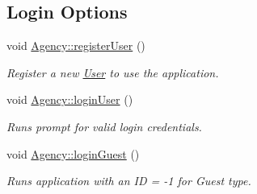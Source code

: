 \subsection*{Login Options}
\begin{DoxyCompactItemize}
\item 
void \hyperlink{group___agency_ga75a16a58bcbc705df50e89531f513c49}{Agency\+::register\+User} ()
\begin{DoxyCompactList}\small\item\em Register a new \hyperlink{class_user}{User} to use the application. \end{DoxyCompactList}\item 
\mbox{\label{group___agency_gae4523bdce3f7af3a2be444c4a2ae0630}} 
void \hyperlink{group___agency_gae4523bdce3f7af3a2be444c4a2ae0630}{Agency\+::login\+User} ()
\begin{DoxyCompactList}\small\item\em Runs prompt for valid login credentials. \end{DoxyCompactList}\item 
\mbox{\label{group___agency_gaddfd587d88999314b59aab8be6438271}} 
void \hyperlink{group___agency_gaddfd587d88999314b59aab8be6438271}{Agency\+::login\+Guest} ()
\begin{DoxyCompactList}\small\item\em Runs application with an ID = -\/1 for Guest type. \end{DoxyCompactList}\end{DoxyCompactItemize}
